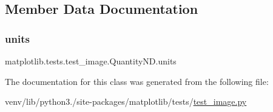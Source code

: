 \subsection{Member Data Documentation}
\mbox{\label{classmatplotlib_1_1tests_1_1test__image_1_1QuantityND_a2c8b629e35fd2f152a420645b8715d4b}} 
\subsubsection{\texorpdfstring{units}{units}}
{\footnotesize\ttfamily matplotlib.\+tests.\+test\+\_\+image.\+Quantity\+N\+D.\+units}



The documentation for this class was generated from the following file\+:\begin{DoxyCompactItemize}
\item 
venv/lib/python3./site-\/packages/matplotlib/tests/\hyperlink{test__image_8py}{test\+\_\+image.\+py}\end{DoxyCompactItemize}
